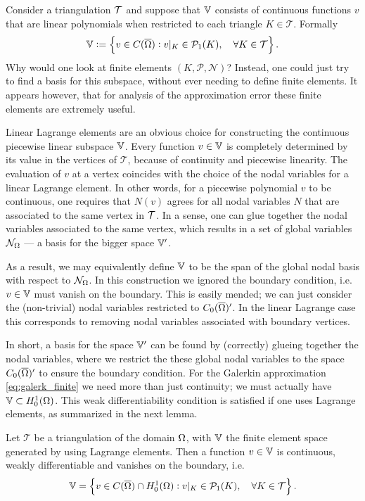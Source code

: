 \documentclass[thesis.tex]{subfiles}
\begin{document}
  Consider a triangulation $\mathcal{T}$ and suppose that $\mathbb{V}$ consists
  of continuous functions $v$ that are linear polynomials when restricted to each triangle $K \in \mathcal{T}$. Formally
  \begin{equation}
    \label{eq:linlagr}
    \mathbb{V} := \set{v \in C(\overline{\Omega}) : v|_{K} \in \mathcal{P}_1(K), \quad \forall K \in \mathcal{T}}.
  \end{equation}
  Why
  would one look at finite elements $(K, \mathcal{P}, \mathcal{N})$? 
  Instead, one could just try to find a basis for this subspace, without ever needing to define finite elements.
  It appears however, that for analysis of the approximation error these finite elements are extremely useful.

  Linear Lagrange elements are an obvious choice for constructing the continuous piecewise linear subspace $\mathbb{V}$.
  Every function $v \in \mathbb{V}$ is completely determined by its value in the vertices of $\mathcal{T}$, 
  because of continuity and piecewise linearity.
  The evaluation of $v$ at a vertex coincides with the choice of the nodal variables for a linear Lagrange element. 
  In other words, for a piecewise polynomial $v$ to be continuous, one requires that $N(v)$ agrees for all nodal variables $N$
  that are associated to the same vertex in $\mathcal{T}$. In a sense, one can glue together
  the nodal variables associated to the same vertex, which results in a set of global variables $\mathcal{N}_\Omega$ --- 
  a basis for the bigger space $\mathbb{V}'$. 
  
  As a result, we may equivalently define $\mathbb{V}$ to be the span of the global nodal basis with respect to $\mathcal{N}_\Omega$.   
  In this construction  we ignored the boundary condition, i.e.~ $v \in \mathbb{V}$ must vanish on the boundary.
  This is easily mended; we can just consider the (non-trivial)
  nodal variables restricted to $C_0(\overline{\Omega})'$.  In the linear Lagrange case this corresponds to removing nodal variables associated with
   boundary vertices.  

   In short, a basis for the space $\mathbb{V}'$ can be found by (correctly) glueing together the nodal variables, where we restrict
  the these global nodal variables to the space $C_0(\overline{\Omega})'$ to ensure the boundary condition.
  For the Galerkin approximation \eqref{eq:galerk_finite} we need more than just continuity; we must actually have $\mathbb{V} \subset H^1_0(\Omega)$. This
  weak differentiability  condition is satisfied if one uses Lagrange elements, as summarized in the next lemma.
  \begin{lem}
    \label{lem:lin_lagrange}
    Let $\mathcal{T}$ be a triangulation of the domain $\Omega$, with $\mathbb{V}$ the finite element space generated
    by using Lagrange elements. Then a function $v \in \mathbb{V}$ is continuous, weakly differentiable and vanishes on the boundary, i.e.
    \[
      \mathbb{V} = \set{v \in C(\overline{\Omega}) \cap H_0^1(\Omega) : v|_{K} \in \mathcal{P}_1(K), \quad \forall K \in \mathcal{T}}.
    \]
  \end{lem}
\end{document}
